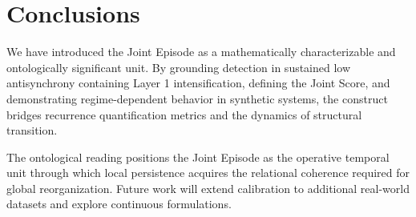 \section{Conclusions}

We have introduced the Joint Episode as a mathematically characterizable and ontologically significant unit. By grounding detection in sustained low antisynchrony containing Layer 1 intensification, defining the Joint Score, and demonstrating regime-dependent behavior in synthetic systems, the construct bridges recurrence quantification metrics and the dynamics of structural transition.

The ontological reading positions the Joint Episode as the operative temporal unit through which local persistence acquires the relational coherence required for global reorganization. Future work will extend calibration to additional real-world datasets and explore continuous formulations.

